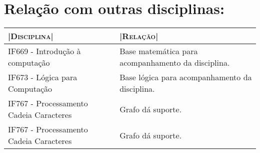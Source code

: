 \documentclass[10pt]{article}
\begin{document}
\section{Relação com outras disciplinas:}

\begin{tabular}{ |p{7cm}||p{7cm}|}
\hline
|\large{\textsc{Disciplina}}|& |\large{\textsc{Relação}}|\\[0.1ex]
\hline

IF669 - Introdução à computação & Base matemática para acompanhamento da disciplina.\\
\hline
IF673 - Lógica para Computação & Base lógica para acompanhamento da disciplina.\\
\hline 
IF767 - Processamento Cadeia Caracteres & Grafo dá suporte.\\
\hline
IF767 - Processamento Cadeia Caracteres & Grafo dá suporte.\\
\hline
\end{tabular}\\



\end{document}
